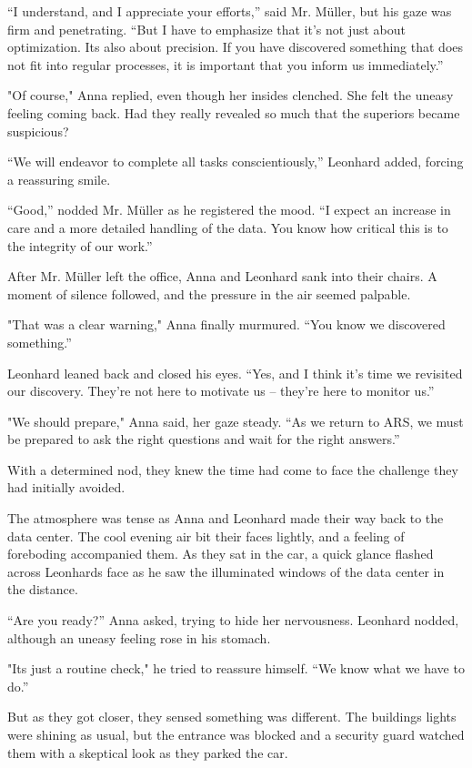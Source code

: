 \documentclass[
]{article}
\begin{document}
``I understand, and I appreciate your efforts,'' said Mr. Müller, but
his gaze was firm and penetrating. ``But I have to emphasize that it's
not just about optimization. It\textquotesingle s also about precision.
If you have discovered something that does not fit into regular
processes, it is important that you inform us immediately.''

"Of course," Anna replied, even though her insides clenched. She felt
the uneasy feeling coming back. Had they really revealed so much that
the superiors became suspicious?

``We will endeavor to complete all tasks conscientiously,'' Leonhard
added, forcing a reassuring smile.

``Good,'' nodded Mr. Müller as he registered the mood. ``I expect an
increase in care and a more detailed handling of the data. You know how
critical this is to the integrity of our work.''

After Mr. Müller left the office, Anna and Leonhard sank into their
chairs. A moment of silence followed, and the pressure in the air seemed
palpable.

"That was a clear warning," Anna finally murmured. ``You know we
discovered something.''

Leonhard leaned back and closed his eyes. ``Yes, and I think it's time
we revisited our discovery. They're not here to motivate us -- they're
here to monitor us.''

"We should prepare," Anna said, her gaze steady. ``As we return to ARS,
we must be prepared to ask the right questions and wait for the right
answers.''

With a determined nod, they knew the time had come to face the challenge
they had initially avoided.

The atmosphere was tense as Anna and Leonhard made their way back to the
data center. The cool evening air bit their faces lightly, and a feeling
of foreboding accompanied them. As they sat in the car, a quick glance
flashed across Leonhard\textquotesingle s face as he saw the illuminated
windows of the data center in the distance.

``Are you ready?'' Anna asked, trying to hide her nervousness. Leonhard
nodded, although an uneasy feeling rose in his stomach.

"It\textquotesingle s just a routine check," he tried to reassure
himself. ``We know what we have to do.''

But as they got closer, they sensed something was different. The
building\textquotesingle s lights were shining as usual, but the
entrance was blocked and a security guard watched them with a skeptical
look as they parked the car.
\end{document}
